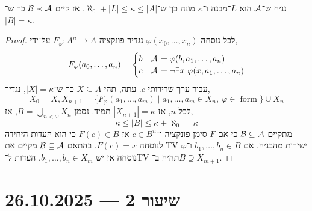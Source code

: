 \begin{corollary}
	נניח ש־$\mathcal{A}$ הוא $L$־מבנה ו־$\kappa$ מונה כך ש־$\aleph_0 + |L| \le \kappa \le |A|$, אז קיים $\mathcal{B} \prec \mathcal{A}$ כך ש־$|B| = \kappa$.
\end{corollary}
\begin{proof}
	לכל נוסחה $\varphi(x_0, \ldots, x_n)$ נגדיר פונקציה $F_{\varphi} : A^n \to A$ על־ידי,
	\[
		F_{\varphi}(a_0, \ldots, a_n)
		= \begin{cases}
			b & \mathcal{A} \models \varphi(b, a_1, \ldots, a_n) \\
			c & \mathcal{A} \models \lnot \exists x\ \varphi(x, a_1, \ldots, a_n)
		\end{cases}
	\]
	עבור ערך שרירותי $c$.
	עתה, תהי $X \subseteq A$ כך ש־$|X| = \kappa$, נגדיר,
	\[
		X_0 = X,
		X_{n + 1} = \{ F_{\varphi}(a_1, \ldots, a_m) \mid a_1, \ldots, a_m \in X_n,\ \varphi \in \operatorname{form} \} \cup X_n
	\]
	לכל $n$, אז $|X_{n + 1}| = \kappa$ תמיד.
	נסמן $B = \bigcup_{n < \omega} X_n$, אז,
	\[
		\kappa \le |B| \le \kappa + \aleph_0 = \kappa
	\]
	מתקיים $\mathcal{B} \subseteq \mathcal{A}$ כי אם $F$ סימן פונקציה ו־$\bar{c} \in B^n$ אז $F(\bar{c}) \in B$ כי הוא העדות היחידה לנוסחה $F(\bar{c}) = x$.
	בהתאם $\mathcal{B} \subseteq \mathcal{A}$ מקיים את TV ישירות מהבניה.
	אם $b_1, \ldots, b_n \in B$ ו־$\varphi$ נוסחה אז יש $b_1, \ldots, b_n \in X_m$, העדות ל־TV תהיה ב־$B \supseteq X_{m + 1}$.
\end{proof}

\section{שיעור 2 --- 26.10.2025}
